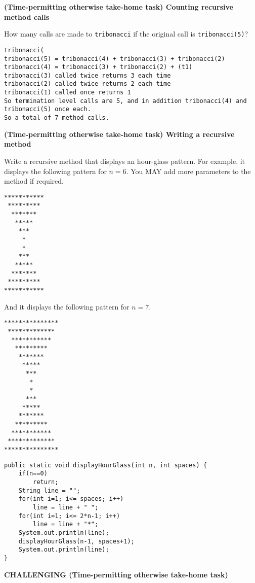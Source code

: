 \begin{questions}
\question  \textbf{(Time-permitting otherwise take-home task) Counting recursive method calls} \vskip 0.5cm

How many calls are made to \texttt{tribonacci} if the original call is \texttt{tribonacci(5)}?

\begin{solution}
\begin{verbatim}tribonacci(
tribonacci(5) = tribonacci(4) + tribonacci(3) + tribonacci(2)
tribonacci(4) = tribonacci(3) + tribonacci(2) + (t1)
tribonacci(3) called twice returns 3 each time
tribonacci(2) called twice returns 2 each time
tribonacci(1) called once returns 1
So termination level calls are 5, and in addition tribonacci(4) and tribonacci(5) once each. 
So a total of 7 method calls.
\end{verbatim}
\end{solution}

\newpage
		
\question  \textbf{(Time-permitting otherwise take-home task) Writing a recursive method} \vskip 0.5cm

Write a recursive method that displays an hour-glass pattern. For example, it displays the following pattern for $n = 6$. You MAY add more parameters to the method if required.

\begin{verbatim}
***********
 *********
  *******
   *****
    ***
     *
     *
    ***
   *****
  *******
 *********
***********
\end{verbatim}

And it displays the following pattern for $n = 7$.

\begin{verbatim}
***************
 *************
  ***********
   *********
    *******
     *****	
      ***
       *
       *
      ***
     *****
    *******
   *********
  ***********
 *************
***************
\end{verbatim}

\ifprintanswers
\begin{lstlisting}
public static void displayHourGlass(int n, int spaces) {
	if(n==0)
		return;
	String line = "";
	for(int i=1; i<= spaces; i++)
		line = line + " ";
	for(int i=1; i<= 2*n-1; i++)
		line = line + "*";
	System.out.println(line);
	displayHourGlass(n-1, spaces+1);
	System.out.println(line);
}
\end{lstlisting}
\else
\fi

\question \textbf{CHALLENGING (Time-permitting otherwise take-home task)} \vskip 0.5cm


\end{questions}
